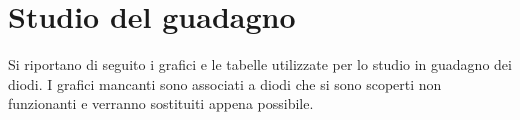 \section{Studio del guadagno}
Si riportano di seguito i grafici e le tabelle utilizzate per lo studio in guadagno dei diodi. I grafici mancanti sono associati a diodi che si sono scoperti non funzionanti
e verranno sostituiti appena possibile.
\FloatBarrier
{}
\FloatBarrier
{}


